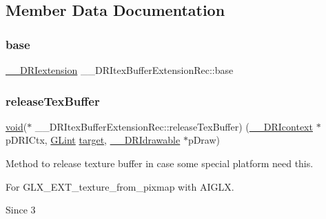 \subsection{Member Data Documentation}
\mbox{\label{struct_____d_r_itex_buffer_extension_rec_a979ee2a12e9e249c0fb492f7308d19a4}} 
\subsubsection{\texorpdfstring{base}{base}}
{\footnotesize\ttfamily \hyperlink{dri__interface_8h_a4e0a61c8ece00d2b2c6792a9a1b55385}{\+\_\+\+\_\+\+D\+R\+Iextension} \+\_\+\+\_\+\+D\+R\+Itex\+Buffer\+Extension\+Rec\+::base}

\mbox{\label{struct_____d_r_itex_buffer_extension_rec_a523c3e47c75adf34910a04abf006cc79}} 
\subsubsection{\texorpdfstring{release\+Tex\+Buffer}{releaseTexBuffer}}
{\footnotesize\ttfamily \hyperlink{_s_d_l__opengles2__gl2ext_8h_ae5d8fa23ad07c48bb609509eae494c95}{void}($\ast$ \+\_\+\+\_\+\+D\+R\+Itex\+Buffer\+Extension\+Rec\+::release\+Tex\+Buffer) (\hyperlink{dri__interface_8h_a3fd295cba82b5a3d79f1ee7e12bfb908}{\+\_\+\+\_\+\+D\+R\+Icontext} $\ast$p\+D\+R\+I\+Ctx, \hyperlink{gl_8h_acebcc1c5663f14ebde1d16831e5fed94}{G\+Lint} \hyperlink{glcorearb_8h_af9d0cbbbeb7414e786c41899e5a856d7}{target}, \hyperlink{dri__interface_8h_a5bfb832a0a08208d95b3bbef439d2262}{\+\_\+\+\_\+\+D\+R\+Idrawable} $\ast$p\+Draw)}

Method to release texture buffer in case some special platform need this.

For G\+L\+X\+\_\+\+E\+X\+T\+\_\+texture\+\_\+from\+\_\+pixmap with A\+I\+G\+LX.

\begin{DoxySince}{Since}
3 
\end{DoxySince}
\mbox{\label{struct_____d_r_itex_buffer_extension_rec_ad30aace2350457abe54c792327be1d3c}} 

